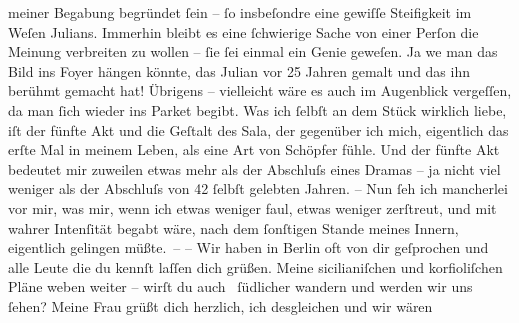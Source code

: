 \begin{ledgroupsized}[t]{13cm}
               meiner Begabung begründet ſein – ſo insbeſondre eine gewiſſe Steifigkeit im Weſen {\pb}Julians. Immerhin
               bleibt es eine ſchwierige Sache von einer Perſon die Meinung verbreiten zu wollen –
               ſie ſei einmal ein Genie geweſen. Ja we{\geminationn} man das Bild
               ins Foyer hängen könnte, das Julian vor 25 Jahren gemalt und das ihn berühmt gemacht hat! Übrigens –
               vielleicht wäre es auch im Augenblick vergeſſen, da man ſich wieder ins Parket
               begibt.\pend
           \pstart
           Was ich ſelbſt an dem Stück
               wirklich liebe, iſt der fünfte Akt und die {\pb}Geſtalt des Sala, der gegenüber ich mich,
               eigentlich das erſte Mal in meinem Leben, als eine Art von Schöpfer fühle. Und der
               fünfte Akt bedeutet mir zuweilen etwas mehr als der Abschluſs eines Dramas – ja nicht
               viel weniger als der Abschluſs von 42 ſelbſt gelebten Jahren. \introOben{}–\introOben{} Nun ſeh ich mancherlei vor mir, was mir, wenn ich etwas weniger faul,
               etwas weniger zerſtreut, und mit \strikeout{\textcolor{gray}{×}\-\textcolor{gray}{×}\-\textcolor{gray}{×}\-\textcolor{gray}{×}-} wahrer Intenſität
               begabt wäre, nach dem ſonſtigen Stande meines Innern, eigentlich gelingen
               müßte. –\pend
           \pstart
           {\pb}– Wir haben in Berlin oft von dir geſprochen und alle Leute die du
               kennſt laſſen dich grüßen. Meine sicilianiſchen und
                  korfioliſchen Pläne weben weiter – wirſt du
               auch  ſüdlicher wandern und werden wir uns ſehen? Meine Frau grüßt dich herzlich, ich desgleichen und wir wären

\end{ledgroupsized}
